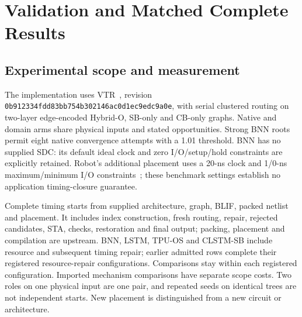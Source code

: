 \documentclass[conference,10pt]{IEEEtran}
\begin{document}
\section{Validation and Matched Complete Results}
\subsection{Experimental scope and measurement}
The implementation uses VTR~\cite{vtr9paper}, revision \texttt{0b912334fdd83bb754b302146ac0d1ec9edc9a0e}, with serial clustered routing on two-layer edge-encoded Hybrid-O, SB-only and CB-only graphs. Native and domain arms share physical inputs and stated opportunities. Strong BNN roots permit eight native convergence attempts with a 1.01 threshold. BNN has no supplied SDC: its default ideal clock and zero I/O/setup/hold constraints are explicitly retained. Robot's additional placement uses a 20-ns clock and 1/0-ns maximum/minimum I/O constraints~\cite{vprsdc}; these benchmark settings establish no application timing-closure guarantee.

Complete timing starts from supplied architecture, graph, BLIF, packed netlist and placement. It includes index construction, fresh routing, repair, rejected candidates, STA, checks, restoration and final output; packing, placement and compilation are upstream. BNN, LSTM, TPU-OS and CLSTM-SB include resource and subsequent timing repair; earlier admitted rows complete their registered resource-repair configurations. Comparisons stay within each registered configuration. Imported mechanism comparisons have separate scope costs. Two roles on one physical input are one pair, and repeated seeds on identical trees are not independent starts. New placement is distinguished from a new circuit or architecture.
\end{document}
